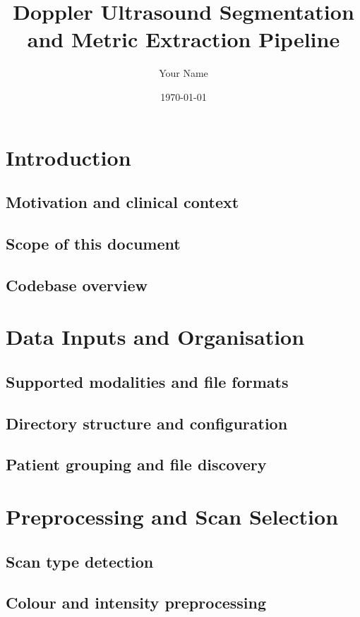 \documentclass[11pt,a4paper]{article}
\title{Doppler Ultrasound Segmentation and Metric Extraction Pipeline}
\author{Your Name}
\date{\today}
\begin{document}
\maketitle
\tableofcontents

\section{Introduction}
  \subsection{Motivation and clinical context}
  \subsection{Scope of this document}
  \subsection{Codebase overview}

\section{Data Inputs and Organisation}
  \subsection{Supported modalities and file formats}
  \subsection{Directory structure and configuration}
  \subsection{Patient grouping and file discovery}

\section{Preprocessing and Scan Selection}
  \subsection{Scan type detection}
  \subsection{Colour and intensity preprocessing}
\end{document}
